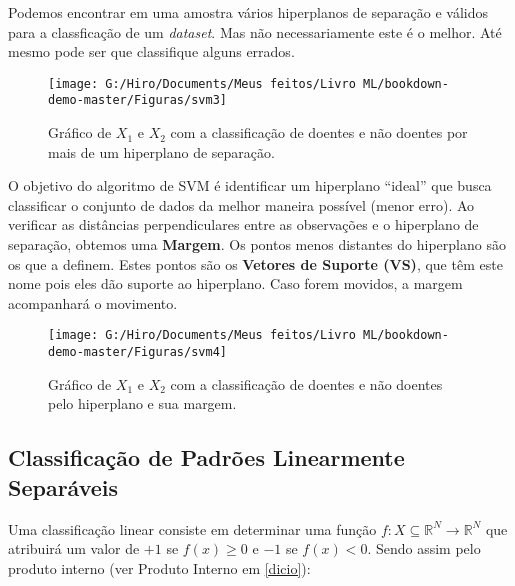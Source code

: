 \documentclass[
  openany]{book}
\begin{document}
Podemos encontrar em uma amostra vários hiperplanos de separação e válidos para a classficação de um \emph{dataset}. Mas não necessariamente este é o melhor. Até mesmo pode ser que classifique alguns errados.

\begin{figure}

{\centering \texttt{[image: G:/Hiro/Documents/Meus feitos/Livro ML/bookdown-demo-master/Figuras/svm3]} 

}

\caption{Gráfico de \(X_1\) e \(X_2\) com a classificação de doentes e não doentes por mais de um hiperplano de separação.}\label{fig:svm3}
\end{figure}



O objetivo do algoritmo de SVM é identificar um hiperplano ``ideal'' que busca classificar o conjunto de dados da melhor maneira possível (menor erro). Ao verificar as distâncias perpendiculares entre as observações e o hiperplano de separação, obtemos uma \textbf{Margem}. Os pontos menos distantes do hiperplano são os que a definem. Estes pontos são os \textbf{Vetores de Suporte (VS)}, que têm este nome pois eles dão suporte ao hiperplano. Caso forem movidos, a margem acompanhará o movimento.

\begin{figure}

{\centering \texttt{[image: G:/Hiro/Documents/Meus feitos/Livro ML/bookdown-demo-master/Figuras/svm4]} 

}

\caption{Gráfico de \(X_1\) e \(X_2\) com a classificação de doentes e não doentes pelo hiperplano e sua margem.}\label{fig:svm4}
\end{figure}



\hypertarget{classificauxe7uxe3o-de-padruxf5es-linearmente-separuxe1veis}{%
\subsection{Classificação de Padrões Linearmente Separáveis}\label{classificauxe7uxe3o-de-padruxf5es-linearmente-separuxe1veis}}

Uma classificação linear consiste em determinar uma função \(f: X \subseteq \mathbb{R}^N \rightarrow \mathbb{R}^N\) que atribuirá um valor de \(+1\) se \(f(x)\geq 0\) e \(-1\) se \(f(x)<0\). Sendo assim pelo produto interno (ver Produto Interno em \ref{dicio}):
\end{document}

